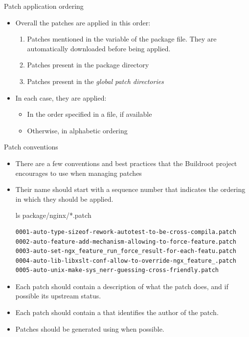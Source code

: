 \begin{frame}{Patch application ordering}
  \begin{itemize}
  \item Overall the patches are applied in this order:
    \begin{enumerate}
    \item Patches mentioned in the  variable of the
      package  file. They are automatically downloaded
      before being applied.
    \item Patches present in the package directory
    \item Patches present in the {\em global patch directories}
    \end{enumerate}
  \item In each case, they are applied:
    \begin{itemize}
    \item In the order specified in a  file, if available
    \item Otherwise, in alphabetic ordering
    \end{itemize}
  \end{itemize}
\end{frame}

\begin{frame}[fragile]{Patch conventions}
  \begin{itemize}
  \item There are a few conventions and best practices that the
    Buildroot project encourages to use when managing patches
  \item Their name should start with a sequence number that
    indicates the ordering in which they should be applied.
    \begin{block}{ls package/nginx/*.patch}
      {\scriptsize
\begin{verbatim}
0001-auto-type-sizeof-rework-autotest-to-be-cross-compila.patch
0002-auto-feature-add-mechanism-allowing-to-force-feature.patch
0003-auto-set-ngx_feature_run_force_result-for-each-featu.patch
0004-auto-lib-libxslt-conf-allow-to-override-ngx_feature_.patch
0005-auto-unix-make-sys_nerr-guessing-cross-friendly.patch
\end{verbatim}}
      \end{block}
    \item Each patch should contain a description of what the patch
      does, and if possible its upstream status.
    \item Each patch should contain a  that
      identifies the author of the patch.
    \item Patches should be generated using
       when possible.
    \end{itemize}
\end{frame}

